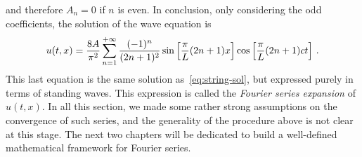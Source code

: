 and therefore $A_n=0$ if $n$ is even. In conclusion, only considering the odd
coefficients, the solution of the wave equation is
\begin{equation}
  u(t,x)=\frac{8A}{\pi^2}\sum_{n=1}^{+\infty}\frac{(-1)^n}{(2n+1)^2}
  \sin\left[\frac{\pi}{L}(2n+1)x\right]\cos\left[\frac{\pi}{L}(2n+1)ct\right]\,.
  \label{eq:string-fourier}
\end{equation}
This last equation is the same solution as~\cref{eq:string-sol}, but expressed purely in
terms of standing waves. This expression is called the \emph{Fourier series expansion} of
$u(t,x)$. In all this section, we made some rather strong assumptions on the convergence
of such series, and the generality of the procedure above is not clear at this stage. The
next two chapters will be dedicated to build a well-defined mathematical framework for
Fourier series.

